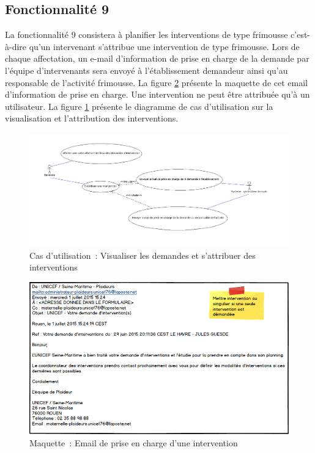 \subsection{Fonctionnalité 9}

La fonctionnalité 9 consistera à planifier les interventions de type frimousse c'est-à-dire qu'un intervenant s'attribue une intervention de type frimousse.
Lors de chaque affectation, un e-mail d'information de prise en charge de la demande par l'équipe d'intervenants sera envoyé à l'établissement demandeur ainsi qu'au responsable de l'activité frimousse.
La figure \ref{courrielPrisChargeFrimousse} présente la maquette de cet email d'information de prise en charge. 
Une intervention ne peut être attribuée qu'à un utilisateur.
  La figure \ref{visualiserESTAttribuer} présente le diagramme de cas d'utilisation sur la visualisation et l'attribution des interventions.\\

\begin{figure}[H]
	\centering
	\includegraphics[scale=0.4]{images/casDUtilisation/fonctionnalite5Attribution.png}
	 \caption{Cas d'utilisation~: Visualiser les demandes et s'attribuer des interventions}
	 \label{visualiserESTAttribuer}
\end{figure}

\begin{figure}[H]
	\centering
	\includegraphics[scale=0.675]{images/maquettes/fonctionnalite5MailDePriseEnCharge.png}
	\caption{Maquette~: Email de prise en charge d'une intervention}
	\label{courrielPrisChargeFrimousse}
\end{figure}
